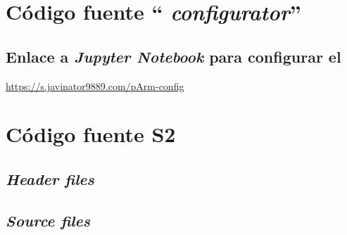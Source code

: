 \chapter{Código fuente ``\pArm{} \textit{configurator}''}
\label{anex:pArm-configurator}


\section{Enlace a \textit{Jupyter Notebook} para configurar el \pArm}
\label{anex:jupyter_binder}
\url{https://s.javinator9889.com/pArm-config}\qquad
{}

\chapter{Código fuente S2}
\label{anex:source_code}
\section{\textit{Header files}}












\section{\textit{Source files}}







